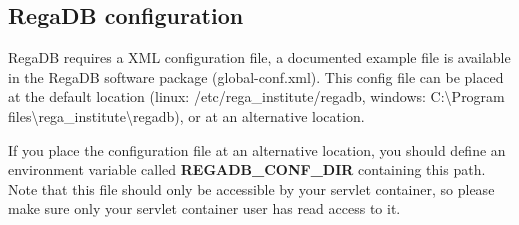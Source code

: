 \subsection{RegaDB configuration}
RegaDB requires a XML configuration file, a documented example file is available in the RegaDB software package (global-conf.xml). This config file can be placed at the default location (linux: /etc/rega\_institute/regadb, windows: C:\textbackslash Program files\textbackslash rega\_institute\textbackslash regadb), or at an alternative location.

If you place the configuration file at an alternative location, you should define an environment variable called \textbf{REGADB\_CONF\_DIR} containing this path.
Note that this file should only be accessible by your servlet container, so please make sure only your servlet container user has read access to it.

